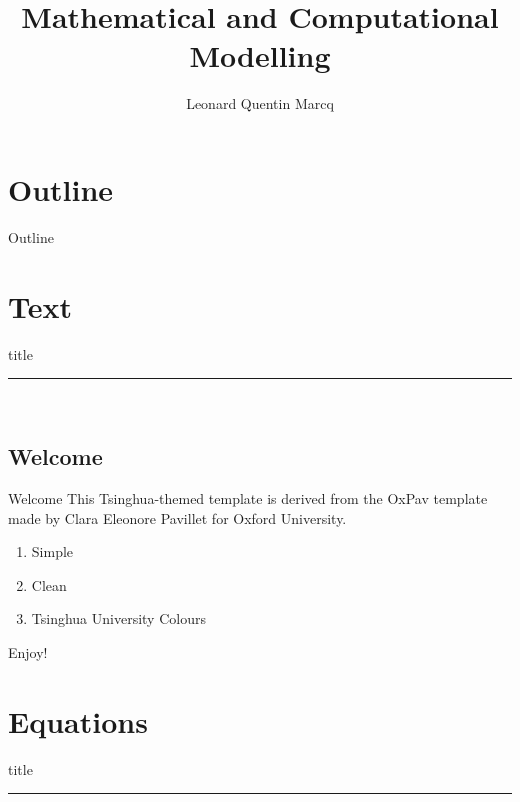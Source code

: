 \documentclass{beamer}
\title{Mathematical and Computational Modelling}
\author{Leonard Quentin Marcq}
\institute{Tsinghua University}
\date{} %
\begin{document}
{ 
\frame{\titlepage}}

\section*{Outline}\begin{frame}{Outline}\tableofcontents\end{frame}

\section{Text}
    \begin{frame}[plain]
        \vfill
      \centering
      \begin{beamercolorbox}[sep=8pt,center,shadow=true,rounded=true]{title}
        \insertsectionhead\par%
        \color{tsinghuapurple}\noindent\rule{10cm}{1pt} \\
        \LARGE{\faFileTextO}
      \end{beamercolorbox}
      \vfill
  \end{frame}


\subsection{Welcome}
\begin{frame}{Welcome}
This Tsinghua-themed template is derived from the OxPav template made by Clara Eleonore Pavillet \href{https://github.com/CEPav}{\faGithub} for Oxford University.

\begin{enumerate}
    \item Simple
    \item Clean
    \item Tsinghua University Colours
\end{enumerate}
\vspace{1cm}
\begin{center}
    Enjoy! \faSmileO
\end{center}
\end{frame}


\section{Equations}
    \begin{frame}[plain]
        \vfill
      \centering
      \begin{beamercolorbox}[sep=8pt,center,shadow=true,rounded=true]{title}
        \insertsectionhead\par%
        \color{tsinghuapurple}\noindent\rule{10cm}{1pt} \\
        \LARGE{\faFileTextO}
      \end{beamercolorbox}
      \vfill
  \end{frame}
  
\end{document}

